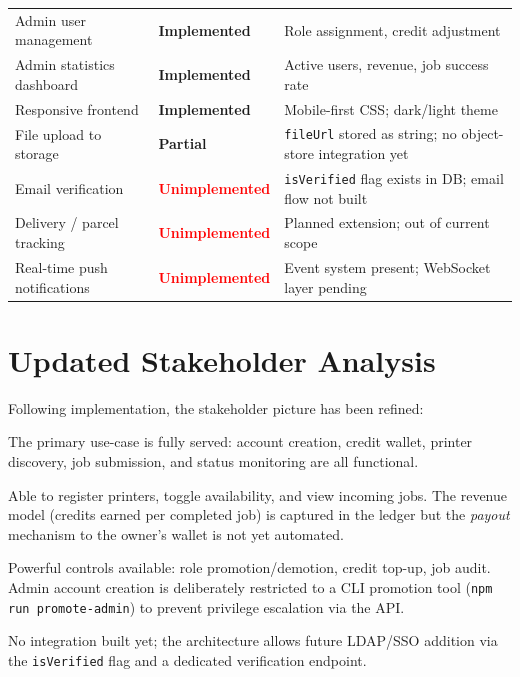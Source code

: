 \documentclass[12pt,a4paper]{report}
\begin{document}
\begin{longtable}{L{5.5cm} C{3.5cm} L{5.5cm}}
  Admin user management & \textcolor{secondary}{\textbf{Implemented}} & Role assignment, credit adjustment \\
  Admin statistics dashboard & \textcolor{secondary}{\textbf{Implemented}} & Active users, revenue, job success rate \\
  Responsive frontend & \textcolor{secondary}{\textbf{Implemented}} & Mobile-first CSS; dark/light theme \\
  File upload to storage & \textcolor{accent}{\textbf{Partial}} & \texttt{fileUrl} stored as string; no object-store integration yet \\
  Email verification & \textcolor{red}{\textbf{Unimplemented}} & \texttt{isVerified} flag exists in DB; email flow not built \\
  Delivery / parcel tracking & \textcolor{red}{\textbf{Unimplemented}} & Planned extension; out of current scope \\
  Real-time push notifications & \textcolor{red}{\textbf{Unimplemented}} & Event system present; WebSocket layer pending \\
\end{longtable}

\section{Updated Stakeholder Analysis}

Following implementation, the stakeholder picture has been refined:

\begin{description}[leftmargin=2em, style=nextline]
  \item[Students] The primary use-case is fully served: account creation, credit wallet, printer
    discovery, job submission, and status monitoring are all functional.
  \item[Printer Owners] Able to register printers, toggle availability, and view incoming
    jobs. The revenue model (credits earned per completed job) is captured in the ledger
    but the \emph{payout} mechanism to the owner's wallet is not yet automated.
  \item[Administrators] Powerful controls available: role promotion/demotion, credit top-up,
    job audit. Admin account creation is deliberately restricted to a CLI promotion tool
    (\texttt{npm run promote-admin}) to prevent privilege escalation via the API.
  \item[University IT] No integration built yet; the architecture allows future LDAP/SSO
    addition via the \texttt{isVerified} flag and a dedicated verification endpoint.
\end{description}
\end{document}
